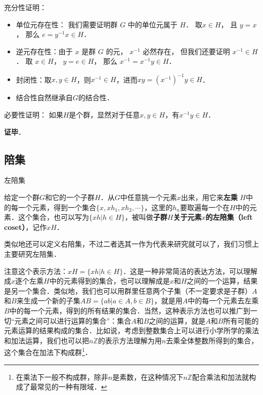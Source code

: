 充分性证明：
\begin{itemize}
\item 单位元存在性： 我们需要证明群 $G$ 中的单位元属于 $H$． 取$x\in H$， 且 $y = x$， 那么 $e = y^{-1}x \in H$．

\item 逆元存在性：由于 $x$ 是群 $G$ 的元， $x^{-1}$ 必然存在， 但我们还要证明 $x^{-1} \in H$． 取 $x \in H$， $y = e \in H$， 那么 $x^{-1} = x^{-1}y \in H$．

\item 封闭性：取$x, y\in H$，则$x^{-1}\in H$，进而$xy=(x^{-1})^{-1}y\in H$．

\item 结合性自然继承自$G$的结合性．
\end{itemize}

必要性证明： 如果$H$是个群，显然对于任意$x, y\in H$，有$x^{-1}y\in H$．

\textbf{证毕}．

\subsection{陪集}

\begin{definition}{左陪集}

给定一个群$G$和它的一个子群$H$．从$G$中任意挑一个元素$x$出来，用它来\textbf{左乘} $H$中的每一个元素，得到一个集合$\{x, xh_1, xh_2, \cdots\}$，这里的$h_n$要取遍每一个在$H$中的元素．这个集合，也可以写为$\{xh|h\in H\}$，被叫做\textbf{子群$H$关于元素$x$的左陪集（left coset）}，记作$xH$． 

\end{definition}

类似地还可以定义右陪集，不过二者选其一作为代表来研究就可以了，我们习惯上主要研究左陪集．

注意这个表示方法：$xH=\{xh|h\in H\}$．这是一种非常简洁的表达方法，可以理解成$x$逐个左乘$H$中的元素得到的集合，也可以理解成是$x$和$H$之间的一个运算，结果是另一个集合．类似地，我们也可以用群里任意两个子集（不一定要求是子群）$A$和$B$来生成一个新的子集$AB=\{ab|a\in A, b\in B\}$，就是用$A$中的每一个元素去左乘$B$中的每一个元素，得到的所有结果的集合．当然，这种表示方法也可以推广到一切“元素之间可以进行运算的集合”：集合$A$和$B$之间的运算，就是$A$和$B$所有可能的元素运算的结果构成的集合．比如说，考虑到整数集合上可以进行小学所学的乘法和加法运算，我们也可以把$n\mathbb{Z}$的表示方法理解为用$n$去乘全体整数所得到的集合，这个集合在加法下构成群\footnote{在乘法下一般不构成群，除非$n$是素数，在这种情况下$n\mathbb{Z}$配合乘法和加法就构成了最常见的一种有限域．}．

